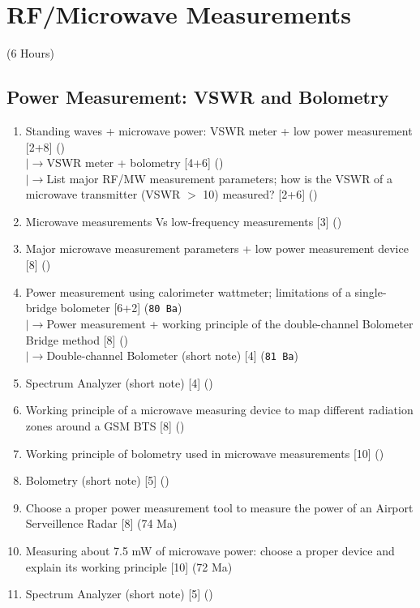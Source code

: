 \documentclass[12pt]{article}
\newcommand{\lb}{\\$\left|\rightarrow\right.$}
\begin{document}
\pagebreak
\section{RF/Microwave Measurements}
\begin{center}(6 Hours)\end{center}

  \subsection{Power Measurement: VSWR and Bolometry}
    \begin{enumerate}[topsep=0pt, noitemsep]
      \item Standing waves + microwave power: VSWR meter + low power measurement \hfill [2+8] ()
        \lb VSWR meter + bolometry \hfill [4+6] ()
        \lb List major RF/MW measurement parameters; how is the VSWR of a microwave transmitter (VSWR $>$ 10) measured? \hfill [2+6] ()
      \item Microwave measurements Vs low-frequency measurements \hfill [3] ()
      \item Major microwave measurement parameters + low power measurement device \hfill [8] ()
      \item Power measurement using calorimeter wattmeter; limitations of a single-bridge bolometer \hfill [6+2] (\texttt{80 Ba})
        \lb Power measurement + working principle of the double-channel Bolometer Bridge method \hfill [8] ()
        \lb Double-channel Bolometer (short note) \hfill [4] (\texttt{81 Ba})
      \item Spectrum Analyzer (short note) \hfill [4] ()
      \item Working principle of a microwave measuring device to map different radiation zones around a GSM BTS \hfill [8] ()
      \item Working principle of bolometry used in microwave measurements \hfill [10] ()
      \item Bolometry (short note) \hfill [5] ()
      \item Choose a proper power measurement tool to measure the power of an Airport Serveillence Radar \hfill [8] (74 Ma)
      \item Measuring about 7.5 mW of microwave power: choose a proper device and explain its working principle \hfill [10] (72 Ma)
      \item Spectrum Analyzer (short note) \hfill [5] ()
    \end{enumerate}
\end{document}
